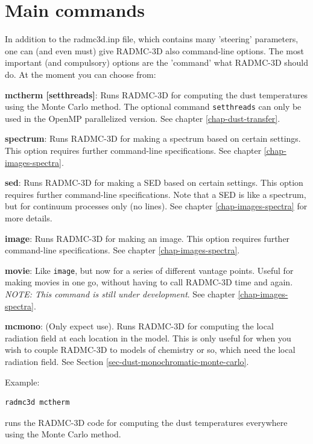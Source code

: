 \documentclass{report}
\newenvironment{options2}%
  {\begin{list}{}{%
    \setlength{\topsep}{1em}%
    \setlength{\parskip}{0em}%
    \setlength{\parsep}{0em}%
    \setlength{\itemsep}{1em}%
    \setlength{\rightmargin}{0em}%
    \setlength{\leftmargin}{13em}%
    \setlength{\labelsep}{1em}%
    \setlength{\labelwidth}{10em}%
    \setlength{\itemindent}{0em}}\normalfont}%
  {\end{list}}
\begin{document}
\section{Main commands}
In addition to the radmc3d.inp file, which contains many 'steering' parameters,
one can (and even must) give RADMC-3D also command-line options. The most
important (and compulsory) options are the 'command' what RADMC-3D should do.
At the moment you can choose from:
\begin{options2}
\item[{\bf mctherm [setthreads]}:\hfill] Runs RADMC-3D for computing the dust
  temperatures using the Monte Carlo method. The optional command {\small\tt setthreads} can only be used in the OpenMP parallelized version. See chapter
  \ref{chap-dust-transfer}.
\item[{\bf spectrum}:\hfill] Runs RADMC-3D for making a spectrum based
  on certain settings. This option requires further command-line
  specifications. See chapter \ref{chap-images-spectra}.
\item[{\bf sed}:\hfill] Runs RADMC-3D for making a SED based on certain
  settings. This option requires further command-line specifications.  Note
  that a SED is like a spectrum, but for continuum processes only (no
  lines). See chapter \ref{chap-images-spectra} for more details.
\item[{\bf image}:\hfill] Runs RADMC-3D for making an image.  This option
  requires further command-line specifications. See chapter
  \ref{chap-images-spectra}.
\item[{\bf movie}:\hfill] Like {\small\tt image}, but now for a series of different
  vantage points. Useful for making movies in one go, without having to call
  RADMC-3D time and again. {\em NOTE: This command is still under
    development}. See chapter \ref{chap-images-spectra}.
\item[{\bf mcmono}:\hfill] (Only expect use). Runs RADMC-3D for computing
  the local radiation field at each location in the model. This is only
  useful for when you wish to couple RADMC-3D to models of chemistry or so,
  which need the local radiation field. See Section
  \ref{sec-dust-monochromatic-monte-carlo}.
\end{options2}

Example:
{\small\begin{verbatim}
radmc3d mctherm
\end{verbatim}}
runs the RADMC-3D code for computing the dust temperatures everywhere using
the Monte Carlo method. 
\end{document}
